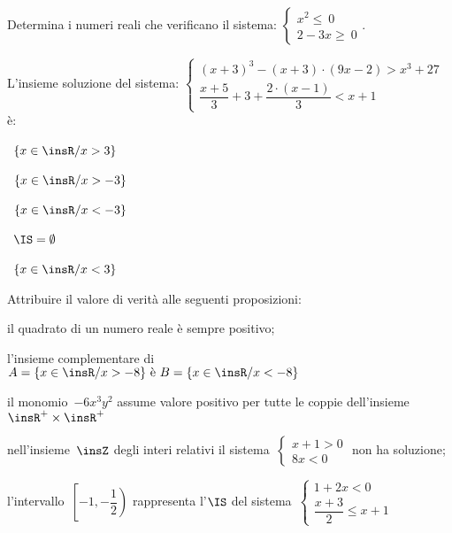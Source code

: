 \begin{esercizio}[\Ast]
 \label{ese:21.34}
 Determina i numeri reali che verificano il sistema:
 $\left\{%
  \begin{array}{l}
  x^{2}\le~0
  \\2-3x\ge~0
 \end{array}\right..$
 \end{esercizio}

\begin{esercizio}
 \label{ese:21.35}
 L'insieme soluzione del sistema:
$\left\{\begin{array}{l}
  (x+3)^{3}-(x+3)\cdot (9x-2)>x^{3}+27\\
  \dfrac{x+5}{3}+3+\dfrac{2\cdot (x-1)}{3}<x+1
 \end{array}\right.$ è:
\begin{multicols}{2}
\boxA\quad~$\left\{x\in \insR/x>3\right\}$

\boxB\quad~$\left\{x\in \insR/x>-3\right\}$

\boxC\quad~$\left\{x\in \insR/x<-3\right\}$

\boxD\quad~$\IS=\emptyset $

\boxE\quad~$\left\{x\in\insR/x<3\right\}$
\end{multicols}

\end{esercizio}

\begin{esercizio}
 \label{ese:21.36}
 Attribuire il valore di verità alle seguenti proposizioni:

\begin{enumeratea}
\item il quadrato di un numero reale è sempre positivo;
\item l'insieme complementare di~$A=\{x\in\insR/x>-8\}\text{ è }B=\{x\in\insR/x<-8\}$
\item il monomio~$-6x^{3}y^{2}$ assume valore positivo per tutte le coppie dell'insieme~$\insR^{+}\times\insR^{+}$
\item nell'insieme~$\insZ$ degli interi relativi il sistema~$\left\{\begin{array}{l}x+1>0\\8x<0\end{array}\right.$ non ha soluzione;
\item l'intervallo~$\left[-1,\left.-{\dfrac{1}{2}}\right)\right.$ rappresenta l'$\IS$ del sistema~$\left\{\begin{array}{l}1+2x<0 \\\dfrac{x+3}{2}\le x+1\end{array}\right.$
\end{enumeratea}
\end{esercizio}

